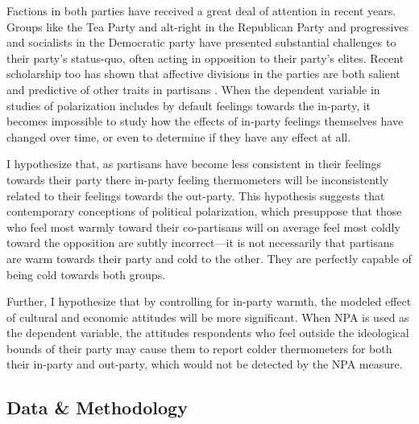 \documentclass[12pt]{article}
\begin{document}
Factions in both parties have received a great deal of attention in recent years. Groups like the Tea Party and alt-right in the Republican Party and progressives and socialists in the Democratic party have presented substantial challenges to their party's status-quo, often acting in opposition to their party's elites. Recent scholarship too has shown that affective divisions in the parties are both salient and predictive of other traits in partisans \citep{wronski2018tale, bankert2020authoritarian}. When the dependent variable in studies of polarization includes by default feelings towards the in-party, it becomes impossible to study how the effects of in-party feelings themselves have changed over time, or even to determine if they have any effect at all.


I hypothesize that, as partisans have become less consistent in their feelings towards their party there in-party feeling thermometers will be inconsistently related to their feelings towards the out-party. This hypothesis suggests that contemporary conceptions of political polarization, which presuppose that those who feel most warmly toward their co-partisans will  on average feel most coldly toward the opposition are subtly incorrect---it is not necessarily that partisans are warm towards their party and cold to the other. They are perfectly capable of being cold towards both groups. 

Further, I hypothesize that by controlling for in-party warmth, the modeled effect of cultural and economic attitudes will be more significant. When NPA is used as the dependent variable, the attitudes respondents who feel outside the ideological bounds of their party may cause them to report colder thermometers for both their in-party and out-party, which would not be detected by the NPA measure.

\subsection{Data \& Methodology}
\end{document}
